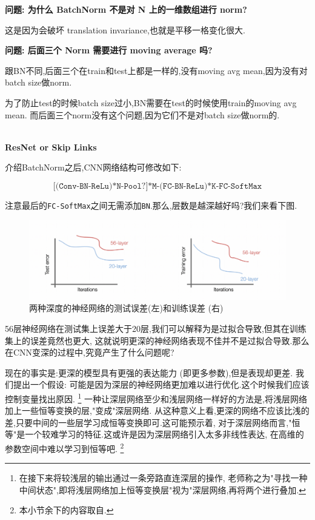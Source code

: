 \textbf{问题: 为什么 BatchNorm 不是对 N 上的一维数组进行 norm?}

这是因为会破坏 translation invariance,也就是平移一格变化很大.

\textbf{问题: 后面三个 Norm 需要进行 moving average 吗?}

跟BN不同,后面三个在train和test上都是一样的,没有moving avg mean,因为没有对batch size做norm.

为了防止test的时候batch size过小,BN需要在test的时候使用train的moving avg mean.
而后面三个norm没有这个问题,因为它们不是对batch size做norm的.

\textbf{\\ResNet or Skip Links}

介绍BatchNorm之后,CNN网络结构可修改如下:

\[\texttt{[(Conv-BN-ReLu)*N-Pool?]*M-(FC-BN-ReLu)*K-FC-SoftMax}\]

注意最后的\texttt{FC-SoftMax}之间无需添加\texttt{BN}.那么,层数是越深越好吗?我们来看下图.
\begin{figure}[htbp]
	\centering
	\includegraphics[scale=0.65]{figures/deep-test-err.png}
	\caption{两种深度的神经网络的测试误差(左)和训练误差 (右)}
	\label{过拟合}
\end{figure}

56层神经网络在测试集上误差大于20层,我们可以解释为是过拟合导致,但其在训练集上的误差竟然也更大,
这就说明更深的神经网络表现不佳并不是过拟合导致.那么在CNN变深的过程中,究竟产生了什么问题呢?

现在的事实是:更深的模型具有更强的表达能力 (即更多参数),但是表现却更差.
我们提出一个假设:
可能是因为深层的神经网络更加难以进行优化.这个时候我们应该控制变量找出原因.
\footnote{在接下来将较浅层的输出通过一条旁路直连深层的操作,
老师称之为"寻找一种中间状态",即将浅层网络加上恒等变换层"视为"深层网络,再将两个进行叠加.}
一种让深层网络至少和浅层网络一样好的方法是,将浅层网络加上一些恒等变换的层,"变成"深层网络.
从这种意义上看,更深的网络不应该比浅的差,只要中间的一些层学习成恒等变换即可.这可能预示着,
对于深层网络而言,"恒等"是一个较难学习的特征.这或许是因为深层网络引入太多非线性表达,
在高维的参数空间中难以学习到恒等吧.
\footnote{本小节余下的内容取自\cite{WhyResNetWorks}.}

